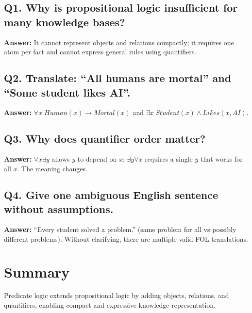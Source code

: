 \documentclass[11pt]{article}
\begin{document}
\subsection*{Q1. Why is propositional logic insufficient for many knowledge bases?}
\textbf{Answer:} It cannot represent objects and relations compactly; it requires one atom per fact and cannot express general rules using quantifiers.

\subsection*{Q2. Translate: ``All humans are mortal'' and ``Some student likes AI''.}
\textbf{Answer:} $\forall x\; Human(x) \rightarrow Mortal(x)$ and $\exists x\; Student(x) \land Likes(x, AI)$.

\subsection*{Q3. Why does quantifier order matter?}
\textbf{Answer:} $\forall x \exists y$ allows $y$ to depend on $x$; $\exists y \forall x$ requires a single $y$ that works for all $x$. The meaning changes.

\subsection*{Q4. Give one ambiguous English sentence without assumptions.}
\textbf{Answer:} ``Every student solved a problem.'' (same problem for all vs possibly different problems). Without clarifying, there are multiple valid FOL translations.

\section{Summary}
Predicate logic extends propositional logic by adding objects, relations, and quantifiers, enabling compact and expressive knowledge representation.
\notesources{\AIMLUnitIISources}
\end{document}
